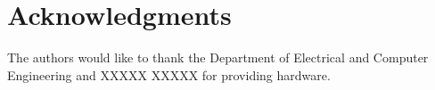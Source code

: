 \documentclass[conference]{IEEEtran}
\begin{document}


\section*{Acknowledgments}

The authors would like to thank the Department of Electrical and Computer
Engineering and XXXXX XXXXX for providing hardware.














\end{document}
